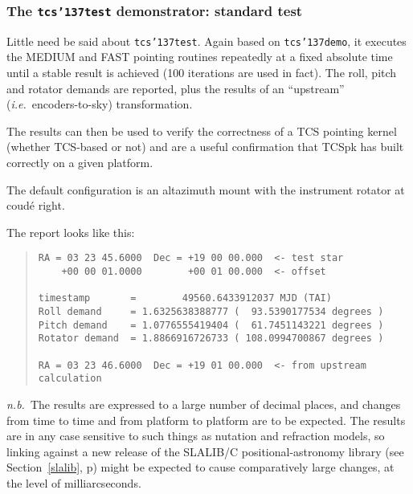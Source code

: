 \documentclass[12pt,fleqn,twoside]{article}
\renewcommand{\_}{{\tt\char'137}}     %
\begin{document}

\newpage
\subsubsection{The {\tt tcs\_test} demonstrator: standard test}
\label{tcs_test}

Little need be said about {\tt tcs\_test}.  Again based on
{\tt tcs\_demo}, it executes the MEDIUM and FAST pointing routines
repeatedly at a fixed absolute time until a stable result is
achieved (100 iterations are used in fact).  The roll, pitch and
rotator demands are reported, plus the results of an
``upstream'' ({\it i.e.}~encoders-to-sky) transformation.

The results can then be used to verify the correctness
of a TCS pointing kernel (whether TCS-based or not) and are a useful
confirmation that TCSpk has built correctly on a given platform.

The default configuration is an altazimuth mount with the
instrument rotator at coud\'e right.

The report looks like this:
\begin{quote}
\begin{small}
\begin{verbatim}
RA = 03 23 45.6000  Dec = +19 00 00.000  <- test star
    +00 00 01.0000        +00 01 00.000  <- offset

timestamp       =        49560.6433912037 MJD (TAI)
Roll demand     = 1.6325638388777 (  93.5390177534 degrees )
Pitch demand    = 1.0776555419404 (  61.7451143221 degrees )
Rotator demand  = 1.8866916726733 ( 108.0994700867 degrees )

RA = 03 23 46.6000  Dec = +19 01 00.000  <- from upstream calculation
\end{verbatim}\end{small}
\end{quote}
{\it n.b.}~The results are expressed to a large number of decimal places,
and changes from time to time and from platform to platform are to be
expected.  The results are in any case sensitive to such things as
nutation and refraction models,
so linking against a new release of the SLALIB/C
positional-astronomy library
(see Section~\ref{slalib}, p\pageref{slalib})
might be expected to cause comparatively large changes, at the level
of milliarcseconds.

\end{document}

